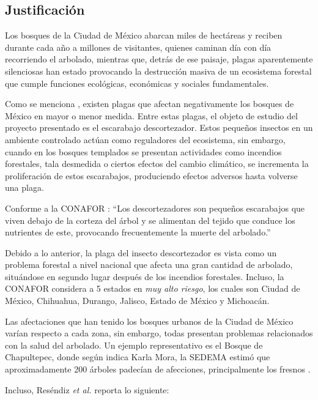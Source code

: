 
\subsection{Justificación}

Los bosques de la Ciudad de México abarcan miles de hectáreas y reciben durante cada año a millones de visitantes, quienes caminan día con día recorriendo el arbolado, mientras que, detrás de ese paisaje, plagas aparentemente silenciosas han estado provocando la destrucción masiva de un ecosistema forestal que cumple funciones ecológicas, económicas y sociales fundamentales.

Como se menciona \cite{vega2022mongabay}, existen plagas que afectan negativamente los bosques de México en mayor o menor medida. Entre estas plagas, el objeto de estudio del proyecto presentado es el escarabajo descortezador. Estos pequeños insectos en un ambiente controlado actúan como reguladores del ecosistema, sin embargo, cuando en los bosques templados se presentan actividades como incendios forestales, tala desmedida o ciertos efectos del cambio climático, se incrementa la proliferación de estos escarabajos, produciendo efectos adversos hasta volverse una plaga. \cite{forestal2025insectos}

Conforme a la CONAFOR \cite{forestal2025insectos}: ``Los descortezadores son pequeños escarabajos que viven debajo de la corteza del árbol y se alimentan del tejido que conduce los nutrientes de este, provocando frecuentemente la muerte del arbolado.''

Debido a lo anterior, la plaga del insecto descortezador es vista como un problema forestal a nivel nacional que afecta una gran cantidad de arbolado, situándose en segundo lugar después de los incendios forestales. Incluso, la CONAFOR considera a 5 estados en \textit{muy alto riesgo}, los cuales son Ciudad de México, Chihuahua, Durango, Jalisco, Estado de México y Michoacán. \cite{rn2025radiografia}

Las afectaciones que han tenido los bosques urbanos de la Ciudad de México varían respecto a cada zona, sin embargo, todas presentan problemas relacionados con la salud del arbolado. Un ejemplo representativo es el Bosque de Chapultepec, donde según indica Karla Mora, la SEDEMA estimó que aproximadamente 200 árboles padecían de afecciones, principalmente los fresnos \cite{mora2022chapultepec}.

Incluso, Reséndiz \textit{et al.} \cite{resendiz2019salud} reporta lo siguiente:

